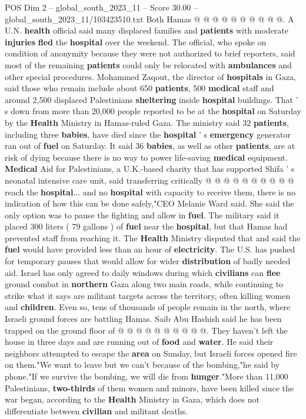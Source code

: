 \begin{textsample}{POS Dim 2 – global\_south\_2023\_11 – Score 30.00 – global\_south\_2023\_11/103423510.txt}
Both Hamas @ @ @ @ @ @ @ @ @ @.
A U.N. \textbf{health} official said many displaced families and \textbf{patients} with moderate \textbf{injuries} \textbf{fled} the \textbf{hospital} over the weekend.
The official, who spoke on condition of anonymity because they were not authorized to brief reporters, said most of the remaining \textbf{patients} could only be relocated with \textbf{ambulances} and other special procedures.
Mohammed Zaqout, the director of \textbf{hospitals} in Gaza, said those who remain include about 650 \textbf{patients}, 500 \textbf{medical} staff and around 2,500 displaced Palestinians \textbf{sheltering} inside \textbf{hospital} buildings.
That ' s down from more than 20,000 people reported to be at the \textbf{hospital} on Saturday by the \textbf{Health} Ministry in Hamas-ruled Gaza.
The ministry said 32 \textbf{patients}, including three \textbf{babies}, have died since the \textbf{hospital} ' s \textbf{emergency} generator ran out of \textbf{fuel} on Saturday.
It said 36 \textbf{babies}, as well as other \textbf{patients}, are at risk of dying because there is no way to power life-saving \textbf{medical} equipment. \textbf{Medical} Aid for Palestinians, a U.K.-based charity that has supported Shifa ' s neonatal intensive care unit, said transferring critically @ @ @ @ @ @ @ @ @ @ reach the \textbf{hospital}... and no \textbf{hospital} with capacity to receive them, there is no indication of how this can be done safely,"CEO Melanie Ward said.
She said the only option was to pause the fighting and allow in \textbf{fuel}.
The military said it placed 300 liters ( 79 gallons ) of \textbf{fuel} near the \textbf{hospital}, but that Hamas had prevented staff from reaching it.
The \textbf{Health} Ministry disputed that and said the \textbf{fuel} would have provided less than an hour of \textbf{electricity}.
The U.S. has pushed for temporary pauses that would allow for wider \textbf{distribution} of badly needed aid.
Israel has only agreed to daily windows during which \textbf{civilians} can \textbf{flee} ground combat in \textbf{northern} Gaza along two main roads, while continuing to strike what it says are militant targets across the territory, often killing women and \textbf{children}.
Even so, tens of thousands of people remain in the north, where Israeli ground forces are battling Hamas.
Saib Abu Hashish said he has been trapped on the ground floor of @ @ @ @ @ @ @ @ @ @.
They haven't left the house in three days and are running out of \textbf{food} and \textbf{water}.
He said their neighbors attempted to escape the \textbf{area} on Sunday, but Israeli forces opened fire on them."We want to leave but we can't because of the bombing,"he said by phone."If we survive the bombing, we will die from \textbf{hunger}."More than 11,000 Palestinians, \textbf{two-thirds} of them women and minors, have been killed since the war began, according to the \textbf{Health} Ministry in Gaza, which does not differentiate between \textbf{civilian} and militant deaths.

\end{textsample}
